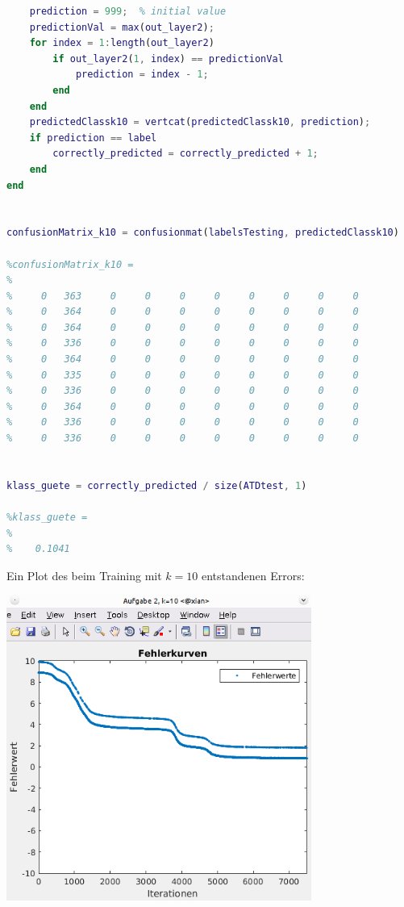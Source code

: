 \documentclass[12pt]{article}
\begin{document}
\begin{lstlisting}[language=Matlab]
    % prediction calculation
    prediction = 999;  % initial value
    predictionVal = max(out_layer2);
    for index = 1:length(out_layer2)
        if out_layer2(1, index) == predictionVal
            prediction = index - 1;
        end
    end
    predictedClassk10 = vertcat(predictedClassk10, prediction);
    if prediction == label
        correctly_predicted = correctly_predicted + 1;
    end
end


confusionMatrix_k10 = confusionmat(labelsTesting, predictedClassk10)

%confusionMatrix_k10 =
%
%     0   363     0     0     0     0     0     0     0     0
%     0   364     0     0     0     0     0     0     0     0
%     0   364     0     0     0     0     0     0     0     0
%     0   336     0     0     0     0     0     0     0     0
%     0   364     0     0     0     0     0     0     0     0
%     0   335     0     0     0     0     0     0     0     0
%     0   336     0     0     0     0     0     0     0     0
%     0   364     0     0     0     0     0     0     0     0
%     0   336     0     0     0     0     0     0     0     0
%     0   336     0     0     0     0     0     0     0     0


klass_guete = correctly_predicted / size(ATDtest, 1)

%klass_guete =
%
%    0.1041
\end{lstlisting}
Ein Plot des beim Training mit $k = 10$ entstandenen Errors:\\
\begin{center}
\includegraphics[width=10cm]{Bilder/errorplot_aufg2_k10.png}
\end{center}
\end{document}
